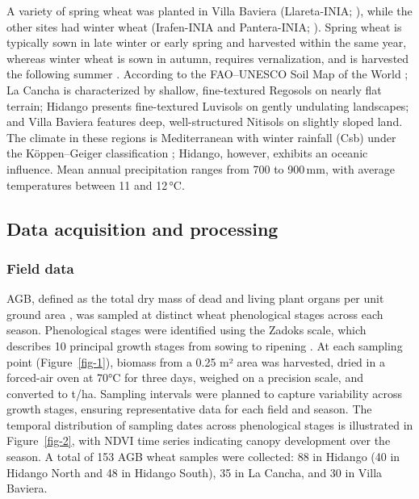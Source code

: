 \documentclass[
  english,
  review,
  number,
  sort,compress,
  authoryear,
  3p]{elsarticle}
\begin{document}
A variety of spring wheat was planted in Villa Baviera (Llareta-INIA;
\citep{Garrido2013}), while the other sites had winter wheat
(Irafen-INIA and Pantera-INIA; \citep{DelPozo2023}). Spring wheat is
typically sown in late winter or early spring and harvested within the
same year, whereas winter wheat is sown in autumn, requires
vernalization, and is harvested the following summer
\citep{Liu2025, Zhao2022}. According to the FAO--UNESCO Soil Map of the
World \citep{FAO2014}; La Cancha is characterized by shallow,
fine-textured Regosols on nearly flat terrain; Hidango presents
fine-textured Luvisols on gently undulating landscapes; and Villa
Baviera features deep, well-structured Nitisols on slightly sloped land.
The climate in these regions is Mediterranean with winter rainfall (Csb)
under the Köppen--Geiger classification \citep{Beck2023}; Hidango,
however, exhibits an oceanic influence. Mean annual precipitation ranges
from 700 to 900\,mm, with average temperatures between 11 and 12\,°C.

\subsection{Data acquisition and
processing}\label{data-acquisition-and-processing}

\subsubsection{Field data}\label{field-data}

AGB, defined as the total dry mass of dead and living plant organs per
unit ground area \citep{Chave2014}, was sampled at distinct wheat
phenological stages across each season. Phenological stages were
identified using the Zadoks scale, which describes 10 principal growth
stages from sowing to ripening \citep{Zadoks1974}. At each sampling
point (Figure~\ref{fig-1}), biomass from a 0.25 m² area was harvested,
dried in a forced-air oven at 70°C for three days, weighed on a
precision scale, and converted to t/ha. Sampling intervals were planned
to capture variability across growth stages, ensuring representative
data for each field and season. The temporal distribution of sampling
dates across phenological stages is illustrated in Figure~\ref{fig-2},
with NDVI time series indicating canopy development over the season. A
total of 153 AGB wheat samples were collected: 88 in Hidango (40 in
Hidango North and 48 in Hidango South), 35 in La Cancha, and 30 in Villa
Baviera.
\end{document}
